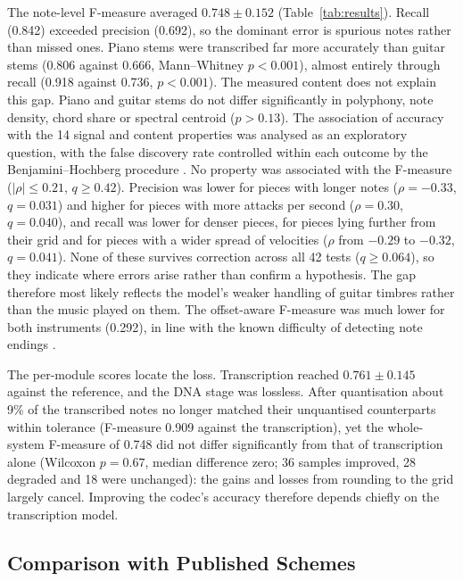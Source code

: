 \documentclass[conference]{IEEEtran}
\begin{document}
The note-level F-measure averaged $0.748 \pm 0.152$ (Table~\ref{tab:results}). Recall (0.842) exceeded precision (0.692), so the dominant error is spurious notes rather than missed ones. Piano stems were transcribed far more accurately than guitar stems (0.806 against 0.666, Mann--Whitney $p < 0.001$), almost entirely through recall (0.918 against 0.736, $p < 0.001$). The measured content does not explain this gap. Piano and guitar stems do not differ significantly in polyphony, note density, chord share or spectral centroid ($p > 0.13$). The association of accuracy with the 14 signal and content properties was analysed as an exploratory question, with the false discovery rate controlled within each outcome by the Benjamini--Hochberg procedure \cite{bh}. No property was associated with the F-measure ($|\rho| \le 0.21$, $q \ge 0.42$). Precision was lower for pieces with longer notes ($\rho = -0.33$, $q = 0.031$) and higher for pieces with more attacks per second ($\rho = 0.30$, $q = 0.040$), and recall was lower for denser pieces, for pieces lying further from their grid and for pieces with a wider spread of velocities ($\rho$ from $-0.29$ to $-0.32$, $q = 0.041$). None of these survives correction across all 42 tests ($q \ge 0.064$), so they indicate where errors arise rather than confirm a hypothesis. The gap therefore most likely reflects the model's weaker handling of guitar timbres rather than the music played on them. The offset-aware F-measure was much lower for both instruments (0.292), in line with the known difficulty of detecting note endings \cite{benetos}.

The per-module scores locate the loss. Transcription reached $0.761 \pm 0.145$ against the reference, and the DNA stage was lossless. After quantisation about 9\% of the transcribed notes no longer matched their unquantised counterparts within tolerance (F-measure 0.909 against the transcription), yet the whole-system F-measure of 0.748 did not differ significantly from that of transcription alone (Wilcoxon $p = 0.67$, median difference zero; 36 samples improved, 28 degraded and 18 were unchanged): the gains and losses from rounding to the grid largely cancel. Improving the codec's accuracy therefore depends chiefly on the transcription model.

\subsection{Comparison with Published Schemes}
\end{document}
